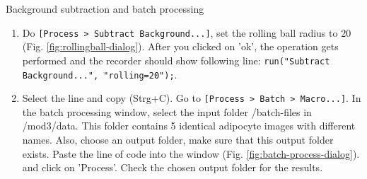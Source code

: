 \begin{taskbox}{Background subtraction and batch processing}
\begin{enumerate}
	\begin{minipage}[t]{\linewidth}
		\begin{center}
		\medskip
		\label{fig:recorder-dialog}
		\end{center}
	\end{minipage}
	
	\item Do \texttt{[Process > Subtract Background...]}, set the rolling ball radius to $20$ (Fig. \ref{fig:rollingball-dialog}). After you clicked on 'ok', the operation gets performed and the recorder should show following line: \texttt{run("Subtract Background...", "rolling=20");}. 
	
	\begin{minipage}[t]{\linewidth}
		\begin{center}
		\medskip
		\label{fig:rollingball-dialog}
		\end{center}
	\end{minipage}
	
	\item Select the line and copy (Strg+C). Go to \texttt{[Process > Batch > Macro...]}. In the batch processing window, select the input folder /batch-files in /mod3/data. This folder contains 5 identical adipocyte images with different names. Also, choose an output folder, make sure that this output folder exists. Paste the line of code into the window (Fig. \ref{fig:batch-process-dialog}). and click on 'Process'. Check the chosen output folder for the results. 
	

\end{enumerate}
\end{taskbox}
